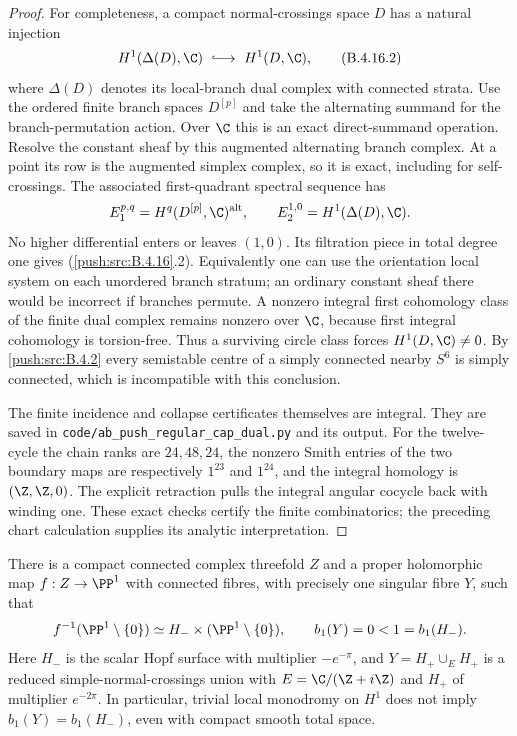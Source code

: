 \begin{proof}
For completeness, a compact normal-crossings space $D$
has a natural injection
\[
 H^1(\Delta(D),\C)\ \lhook\joinrel\longrightarrow\
 H^1(D,\C),
 \tag{B.4.16.2}
\]
where $\Delta(D)$ denotes its local-branch dual
complex with connected strata. Use the ordered finite
branch spaces $D^{[p]}$ and take the alternating
summand for the branch-permutation action. Over $\C$
this is an exact direct-summand operation. Resolve the
constant sheaf by this augmented alternating branch
complex. At a point its row is the augmented simplex
complex, so it is exact, including for self-crossings.
The associated first-quadrant spectral sequence has
\[
 E_1^{p,q}=H^q(D^{[p]},\C)^{\mathrm{alt}},
 \qquad
 E_2^{1,0}=H^1(\Delta(D),\C).
\]
No higher differential enters or leaves $(1,0)$.
Its filtration piece in total degree one gives
(\ref{push:src:B.4.16}.2). Equivalently one can use the orientation
local system on each unordered branch stratum; an
ordinary constant sheaf there would be incorrect if
branches permute. A nonzero integral first cohomology
class of the finite dual complex remains nonzero over
$\C$, because first integral cohomology is torsion-free.
Thus a surviving circle class forces $H^1(D,\C)\ne0$.
By \ref{push:src:B.4.2} every semistable centre of
a simply connected nearby $S^6$ is simply connected,
which is incompatible with this conclusion.

The finite incidence and collapse certificates themselves
are integral. They are
saved in \texttt{code/ab\_push\_regular\_cap\_dual.py}
and its output. For the twelve-cycle the chain ranks
are $24,48,24$, the nonzero Smith entries of the two
boundary maps are respectively $1^{23}$ and $1^{24}$,
and the integral homology is $(\Z,\Z,0)$.
The explicit retraction pulls the integral angular
cocycle back with winding one. These exact checks
certify the finite combinatorics; the preceding chart
calculation supplies its analytic interpretation.
\end{proof}

\begin{proposition}\label{push:src:B.4.17}
There is a compact connected complex threefold $Z$ and a proper
holomorphic map $f:Z\to\PP^1$ with connected fibres, with precisely
one singular fibre $Y$, such that
\[
 f^{-1}(\PP^1\setminus\{0\})
 \simeq H_-\times(\PP^1\setminus\{0\}),\qquad
 b_1(Y)=0<1=b_1(H_-).
\]
Here $H_-$ is the scalar Hopf surface with multiplier $-e^{-\pi}$,
and $Y=H_+\cup_E H_+$ is a reduced simple-normal-crossings union
with $E=\C/(\Z+i\Z)$ and $H_+$ of multiplier $e^{-2\pi}$.
In particular, trivial local monodromy on $H^1$ does not imply
$b_1(Y)=b_1(H_-)$, even with compact smooth total space.
\end{proposition}

